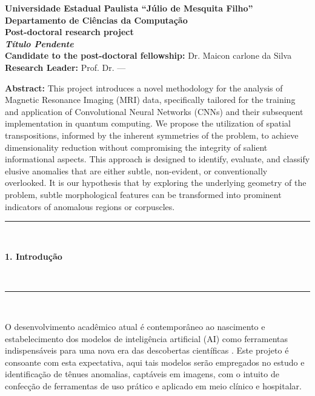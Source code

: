 \documentclass[a4paper, 12pt]{report}
\begin{document}
\begin{titlepage}
\begin{center}
\textbf{Universidade Estadual Paulista \textquotedblleft{Júlio de Mesquita Filho}\textquotedblright}\\
\textbf{Departamento de Ciências da Computação}\\
\vspace{2cm}
\textbf{Post-doctoral research project}\\
\vspace{2cm}
\textbf{\textit{{\Large Título Pendente }}}\\
\vspace{2cm}
\textbf{Candidate to the post-doctoral fellowship:} Dr. Maicon carlone da Silva\\
\textbf{Research Leader:} Prof. Dr. ---%
\vspace{2cm}
\end{center}
\textbf{Abstract:}
This project introduces a novel methodology for the analysis of Magnetic Resonance Imaging (MRI) data, specifically tailored for the training and application of Convolutional Neural Networks (CNNs) and their subsequent implementation in quantum computing. We propose the utilization of spatial transpositions, informed by the inherent symmetries of the problem, to achieve dimensionality reduction without compromising the integrity of salient informational aspects. This approach is designed to identify, evaluate, and classify elusive anomalies that are either subtle, non-evident, or conventionally overlooked. It is our hypothesis that by exploring the underlying geometry of the problem, subtle morphological features can be transformed into prominent indicators of anomalous regions or corpuscles.
\end{titlepage}

\hrule $\frac{}{}$\\
\begin{LARGE}
\textbf{1. Introdução}
\end{LARGE}
\\ \hrule $\frac{}{}$\par

O desenvolvimento acadêmico atual é contemporâneo ao nascimento e estabelecimento dos modelos de inteligência artificial (AI) como ferramentas indispensáveis para uma nova era das descobertas científicas \cite{KohArtificial2022,ZhangMachine2023,ZhangNovel2023,LiPerformance2019Nov,LiuEvolving2020Jan}. Este projeto é consoante com esta expectativa, aqui tais modelos serão empregados no estudo e identificação de tênues anomalias, captáveis em imagens, com o intuito de confecção de ferramentas de uso prático e aplicado em meio clínico e hospitalar.
\end{document}
